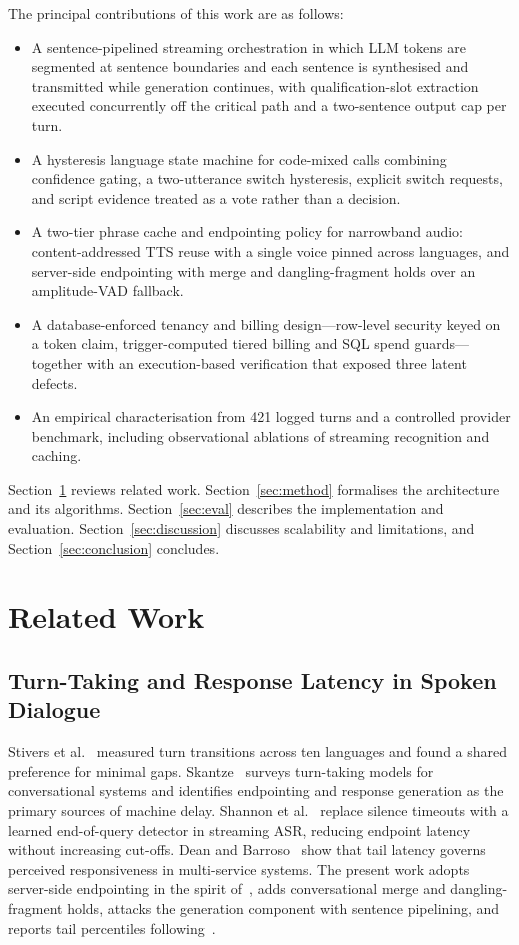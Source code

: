 \documentclass[conference]{IEEEtran}
\begin{document}
The principal contributions of this work are as follows:
\begin{itemize}
\item A sentence-pipelined streaming orchestration in which LLM tokens are segmented at sentence boundaries and each sentence is synthesised and transmitted while generation continues, with qualification-slot extraction executed concurrently off the critical path and a two-sentence output cap per turn.
\item A hysteresis language state machine for code-mixed calls combining confidence gating, a two-utterance switch hysteresis, explicit switch requests, and script evidence treated as a vote rather than a decision.
\item A two-tier phrase cache and endpointing policy for narrowband audio: content-addressed TTS reuse with a single voice pinned across languages, and server-side endpointing with merge and dangling-fragment holds over an amplitude-VAD fallback.
\item A database-enforced tenancy and billing design---row-level security keyed on a token claim, trigger-computed tiered billing and SQL spend guards---together with an execution-based verification that exposed three latent defects.
\item An empirical characterisation from 421 logged turns and a controlled provider benchmark, including observational ablations of streaming recognition and caching.
\end{itemize}

Section~\ref{sec:related} reviews related work. Section~\ref{sec:method} formalises the architecture and its algorithms. Section~\ref{sec:eval} describes the implementation and evaluation. Section~\ref{sec:discussion} discusses scalability and limitations, and Section~\ref{sec:conclusion} concludes.

\section{Related Work}\label{sec:related}

\subsection{Turn-Taking and Response Latency in Spoken Dialogue}
Stivers et al.~\cite{stivers2009} measured turn transitions across ten languages and found a shared preference for minimal gaps. Skantze~\cite{skantze2021} surveys turn-taking models for conversational systems and identifies endpointing and response generation as the primary sources of machine delay. Shannon et al.~\cite{shannon2017} replace silence timeouts with a learned end-of-query detector in streaming ASR, reducing endpoint latency without increasing cut-offs. Dean and Barroso~\cite{dean2013} show that tail latency governs perceived responsiveness in multi-service systems. The present work adopts server-side endpointing in the spirit of~\cite{shannon2017}, adds conversational merge and dangling-fragment holds, attacks the generation component with sentence pipelining, and reports tail percentiles following~\cite{dean2013}.
\end{document}
